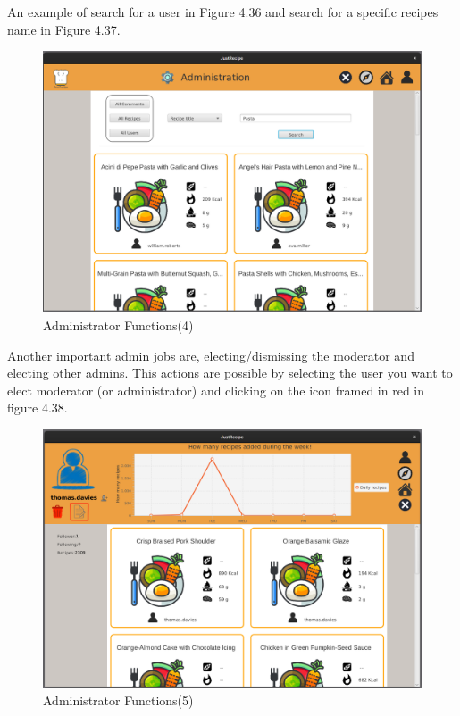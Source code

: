 \documentclass[a4paper]{report}
\begin{document}
\noindent An example of search for a user in Figure 4.36 and search for a specific recipes name in Figure 4.37.
\begin{figure}[htpb]
	\centering
	\includegraphics[scale=0.37]{img/user_manual/administratorFunction4.png}
	\caption{Administrator Functions(4)}
\end{figure}

\noindent Another important admin jobs are, electing/dismissing the moderator and electing other admins. This actions are possible by selecting the user you want to elect moderator (or administrator) and clicking on the icon framed in red in figure 4.38.
\begin{figure}[htpb]
	\centering
	\includegraphics[scale=0.37]{img/user_manual/administratorFunction5.png}
	\caption{Administrator Functions(5)}
\end{figure}
\end{document}
